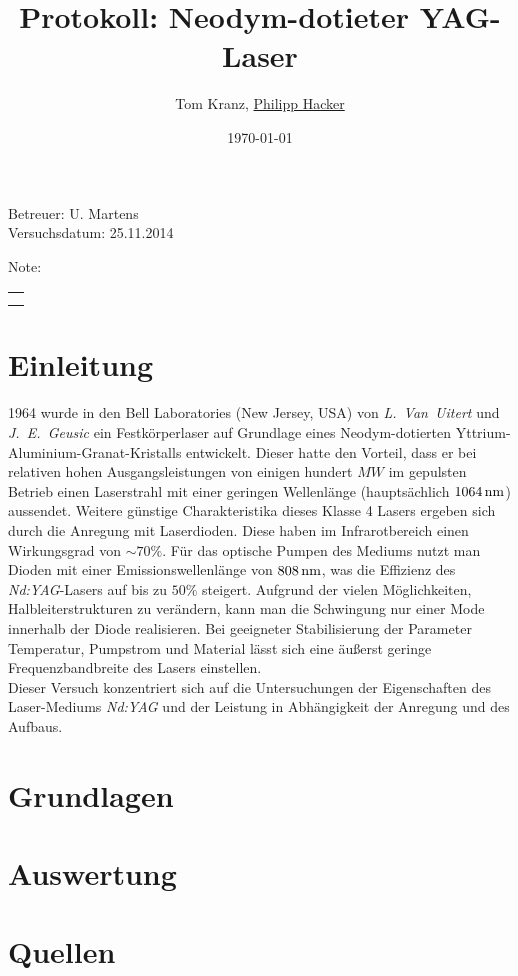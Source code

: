 \documentclass[numbers=noenddot,12pt,a4paper]{scrartcl}
\title{Protokoll: Neodym-dotieter YAG-Laser} %
\author{Tom Kranz, \underline{Philipp Hacker}} %
\date{\today}
\newcommand{\tilt}[1]{\mbox{\textit{#1}}}
\begin{document}
\maketitle
\begin{center}
Betreuer: U. Martens\\ %
Versuchsdatum: 25.11.2014\\ %
\begin{table}[h]
\centering
Note: %
\begin{tabularx}{1.5cm}{|X|}
\hline \\ \\
\hline
\end{tabularx}
\end{table}
\end{center}
\vspace*{\fill}
\tableofcontents
\vfill
\newpage
\section{Einleitung}
1964 wurde in den Bell Laboratories (New Jersey, USA) von \tilt{L. Van Uitert} und \tilt{J. E. Geusic} ein Festkörperlaser auf Grundlage eines Neodym-dotierten Yttrium-Aluminium-Granat-Kristalls entwickelt. Dieser hatte den Vorteil, dass er bei relativen hohen Ausgangsleistungen von einigen hundert $\unit{MW}$ im gepulsten Betrieb einen Laserstrahl mit einer geringen Wellenlänge (hauptsächlich $\unit[1064]{nm}$) aussendet. Weitere günstige Charakteristika dieses Klasse 4 Lasers ergeben sich durch die Anregung mit Laserdioden. Diese haben im Infrarotbereich einen Wirkungsgrad von $\sim70 \%$. Für das optische Pumpen des Mediums nutzt man Dioden mit einer Emissionswellenlänge von $\unit[808]{nm}$, was die Effizienz des \tilt{Nd:YAG}-Lasers auf bis zu $50\%$ steigert. Aufgrund der vielen Möglichkeiten, Halbleiterstrukturen zu verändern, kann man die Schwingung nur einer Mode innerhalb der Diode realisieren. Bei geeigneter Stabilisierung der Parameter Temperatur, Pumpstrom und Material lässt sich eine äußerst geringe Frequenzbandbreite des Lasers einstellen. \\
Dieser Versuch konzentriert sich auf die Untersuchungen der Eigenschaften des Laser-Mediums \tilt{Nd:YAG} und der Leistung in Abhängigkeit der Anregung und des Aufbaus. 
\section{Grundlagen}
\section{Auswertung}
\section{Quellen}
\end{document}
